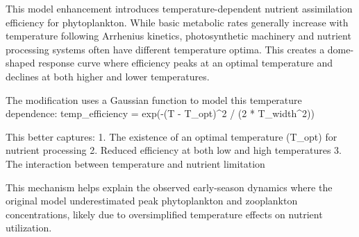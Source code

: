 This model enhancement introduces temperature-dependent nutrient assimilation efficiency for phytoplankton. While basic metabolic rates generally increase with temperature following Arrhenius kinetics, photosynthetic machinery and nutrient processing systems often have different temperature optima. This creates a dome-shaped response curve where efficiency peaks at an optimal temperature and declines at both higher and lower temperatures.

The modification uses a Gaussian function to model this temperature dependence:
temp_efficiency = exp(-(T - T_opt)^2 / (2 * T_width^2))

This better captures:
1. The existence of an optimal temperature (T_opt) for nutrient processing
2. Reduced efficiency at both low and high temperatures
3. The interaction between temperature and nutrient limitation

This mechanism helps explain the observed early-season dynamics where the original model underestimated peak phytoplankton and zooplankton concentrations, likely due to oversimplified temperature effects on nutrient utilization.
